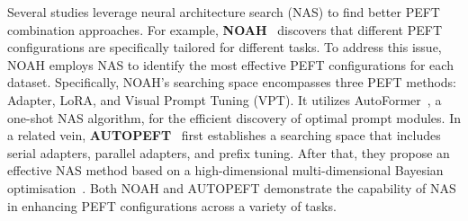 Several studies leverage neural architecture search (NAS) to find better PEFT combination approaches. For example, \textbf{NOAH}~\cite{noah} discovers that different PEFT configurations are specifically tailored for different tasks. To address this issue, NOAH employs NAS to identify the most effective PEFT configurations for each dataset. Specifically, NOAH's searching space encompasses three PEFT methods: Adapter, LoRA, and Visual Prompt Tuning (VPT). It utilizes AutoFormer~\cite{autoformer}, a one-shot NAS algorithm, for the efficient discovery of optimal prompt modules. In a related vein, \textbf{AUTOPEFT}~\cite{autopeft} first establishes a searching space that includes serial adapters, parallel adapters, and prefix tuning. After that, they propose an effective NAS method based on a high-dimensional multi-dimensional Bayesian optimisation~\cite{frazier2018tutorial}. Both NOAH and AUTOPEFT demonstrate the capability of NAS in enhancing PEFT configurations across a variety of tasks. 



